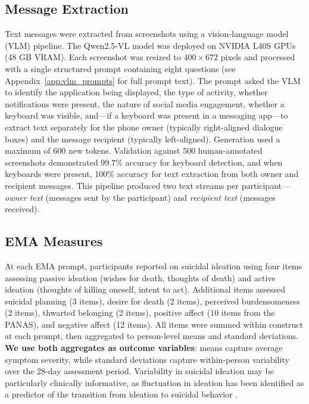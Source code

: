 \documentclass[review,12pt,authoryear]{elsarticle}
\begin{document}
\subsection{Message Extraction}

Text messages were extracted from screenshots using a vision-language model (VLM) pipeline. The Qwen2.5-VL model \citep{qwen2025qwen3} was deployed on NVIDIA L40S GPUs (48 GB VRAM). Each screenshot was resized to $400 \times 672$ pixels and processed with a single structured prompt containing eight questions (see Appendix~\ref{app:vlm_prompts} for full prompt text). The prompt asked the VLM to identify the application being displayed, the type of activity, whether notifications were present, the nature of social media engagement, whether a keyboard was visible, and---if a keyboard was present in a messaging app---to extract text separately for the phone owner (typically right-aligned dialogue boxes) and the message recipient (typically left-aligned). Generation used a maximum of 600 new tokens. Validation against 500 human-annotated screenshots demonstrated 99.7\% accuracy for keyboard detection, and when keyboards were present, 100\% accuracy for text extraction from both owner and recipient messages. This pipeline produced two text streams per participant---\textit{owner text} (messages sent by the participant) and \textit{recipient text} (messages received).

\subsection{EMA Measures}

At each EMA prompt, participants reported on suicidal ideation using four items assessing passive ideation (wishes for death, thoughts of death) and active ideation (thoughts of killing oneself, intent to act). Additional items assessed suicidal planning (3 items), desire for death (2 items), perceived burdensomeness (2 items), thwarted belonging (2 items), positive affect (10 items from the PANAS), and negative affect (12 items). All items were summed within construct at each prompt, then aggregated to person-level means and standard deviations. \textbf{We use both aggregates as outcome variables}: means capture average symptom severity, while standard deviations capture within-person variability over the 28-day assessment period. Variability in suicidal ideation may be particularly clinically informative, as fluctuation in ideation has been identified as a predictor of the transition from ideation to suicidal behavior \citep{kleiman2017examination}.
\end{document}
